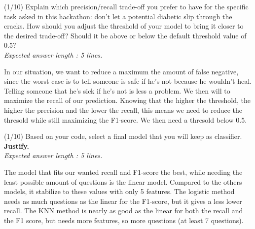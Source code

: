 \documentclass [a4paper, 11pt] {article}
\begin{document}
\begin{question}{2.2}
(1/10) Explain which precision/recall trade-off you prefer to have for the specific task asked in this hackathon: don't let a potential diabetic slip through the cracks. How should you adjust the threshold of your model to bring it closer to the desired trade-off? Should it be above or below the default threshold value of 0.5?\\
\textit{Expected answer length : 5 lines.}
\end{question}
\begin{answer}\color{blue}
In our situation, we want to reduce a maximum the amount of false negative, since the worst case is to tell someone is safe if he's not because he wouldn't heal. Telling someone that he's sick if he's not is less a problem. We then will to maximize the recall of our prediction.
Knowing that the higher the threshold, the higher the precision and the lower the recall, this means we need to reduce the thresold while still maximizing the F1-score. We then need a thresold below 0.5. 
\end{answer}

\begin{question}{2.3}
(1/10) Based on your code, select a final model that you will keep as classifier. \textbf{Justify.} \\
\textit{Expected answer length : 5 lines.}
\end{question}
\begin{answer} \color{blue}
The model that fits our wanted recall and F1-score the best, while needing the least possible amount of questions is the linear model. Compared to the others models, it stabilize to these values with only 5 features.
The logistic method needs as much questions as the linear for the F1-score, but it gives a less lower recall. The KNN method is nearly as good as the linear for both the recall and the F1 score, but needs more features, so more questions (at least 7 questions).

\end{answer}
\end{document}
